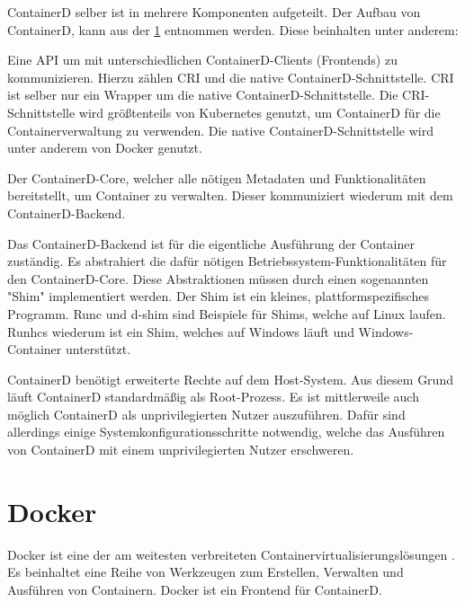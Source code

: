 \begin{figure}[H]
    \label{fig:containerd-architecture}
\end{figure}


ContainerD selber ist in mehrere Komponenten aufgeteilt. Der Aufbau von ContainerD, kann aus der \cref{fig:containerd-architecture} entnommen werden. Diese beinhalten unter anderem:

Eine API um mit unterschiedlichen ContainerD-Clients (Frontends) zu kommunizieren. Hierzu zählen CRI und die native ContainerD-Schnittstelle. CRI ist selber nur ein Wrapper um die native ContainerD-Schnittstelle. Die CRI-Schnittstelle wird größtenteils von Kubernetes genutzt, um ContainerD für die Containerverwaltung zu verwenden. Die native ContainerD-Schnittstelle wird unter anderem von Docker genutzt.

Der ContainerD-Core, welcher alle nötigen Metadaten und Funktionalitäten bereitstellt, um Container zu verwalten. Dieser kommuniziert wiederum mit dem ContainerD-Backend.

Das ContainerD-Backend ist für die eigentliche Ausführung der Container zuständig. Es abstrahiert die dafür nötigen Betriebssystem-Funktionalitäten für den ContainerD-Core. Diese Abstraktionen müssen durch einen sogenannten "Shim" implementiert werden. Der Shim ist ein kleines, plattformspezifisches Programm. Runc und d-shim sind Beispiele für Shims, welche auf Linux laufen. Runhcs wiederum ist ein Shim, welches auf Windows läuft und Windows-Container unterstützt.  

ContainerD benötigt erweiterte Rechte auf dem Host-System. Aus diesem Grund läuft ContainerD standardmäßig als Root-Prozess. Es ist mittlerweile auch möglich ContainerD als unprivilegierten Nutzer auszuführen. Dafür sind allerdings einige Systemkonfigurationsschritte notwendig, welche das Ausführen von ContainerD mit einem unprivilegierten Nutzer erschweren.

\pagebreak

\section{Docker}

Docker ist eine der am weitesten verbreiteten Containervirtualisierungslösungen \cite{LeadingContainerizationTechnologiesa}. Es beinhaltet eine Reihe von Werkzeugen zum Erstellen, Verwalten und Ausführen von Containern. Docker ist ein Frontend für ContainerD.

